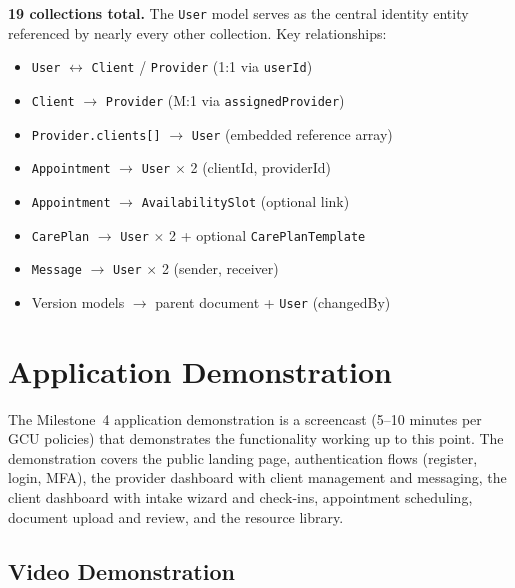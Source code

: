 \documentclass[12pt,letterpaper]{article}
\begin{document}
\textbf{19 collections total.} The \texttt{User} model serves as the central identity entity referenced by nearly every other collection. Key relationships:

\begin{itemize}[nosep]
  \item \texttt{User} $\longleftrightarrow$ \texttt{Client} / \texttt{Provider} (1:1 via \texttt{userId})
  \item \texttt{Client} $\longrightarrow$ \texttt{Provider} (M:1 via \texttt{assignedProvider})
  \item \texttt{Provider.clients[]} $\longrightarrow$ \texttt{User} (embedded reference array)
  \item \texttt{Appointment} $\longrightarrow$ \texttt{User} $\times$ 2 (clientId, providerId)
  \item \texttt{Appointment} $\longrightarrow$ \texttt{AvailabilitySlot} (optional link)
  \item \texttt{CarePlan} $\longrightarrow$ \texttt{User} $\times$ 2 + optional \texttt{CarePlanTemplate}
  \item \texttt{Message} $\longrightarrow$ \texttt{User} $\times$ 2 (sender, receiver)
  \item Version models $\longrightarrow$ parent document + \texttt{User} (changedBy)
\end{itemize}

\newpage

\section{Application Demonstration}

The Milestone~4 application demonstration is a screencast (5--10 minutes per GCU policies) that demonstrates the functionality working up to this point. The demonstration covers the public landing page, authentication flows (register, login, MFA), the provider dashboard with client management and messaging, the client dashboard with intake wizard and check-ins, appointment scheduling, document upload and review, and the resource library.

\subsection{Video Demonstration}
\end{document}
